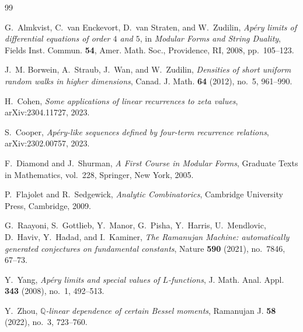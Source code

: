 \documentclass[11pt]{amsart}
\theoremstyle{definition}
\theoremstyle{remark}
\newcommand{\Q}{\mathbb{Q}}
\begin{document}
\begin{thebibliography}{99}

G.~Almkvist, C.~van Enckevort, D.~van Straten, and W.~Zudilin,
\emph{Apéry limits of differential equations of order $4$ and $5$},
in \emph{Modular Forms and String Duality}, Fields Inst. Commun. \textbf{54},
Amer. Math. Soc., Providence, RI, 2008, pp.~105--123.

J.~M. Borwein, A.~Straub, J.~Wan, and W.~Zudilin,
\emph{Densities of short uniform random walks in higher dimensions},
Canad. J. Math. \textbf{64} (2012), no.~5, 961--990.

H.~Cohen,
\emph{Some applications of linear recurrences to zeta values},
arXiv:2304.11727, 2023.

S.~Cooper,
\emph{Apéry-like sequences defined by four-term recurrence relations},
arXiv:2302.00757, 2023.

F.~Diamond and J.~Shurman,
\emph{A First Course in Modular Forms},
Graduate Texts in Mathematics, vol.~228, Springer, New York, 2005.

P.~Flajolet and R.~Sedgewick,
\emph{Analytic Combinatorics},
Cambridge University Press, Cambridge, 2009.

G.~Raayoni, S.~Gottlieb, Y.~Manor, G.~Pisha, Y.~Harris, U.~Mendlovic,
D.~Haviv, Y.~Hadad, and I.~Kaminer,
\emph{The Ramanujan Machine: automatically generated conjectures on fundamental constants},
Nature \textbf{590} (2021), no.~7846, 67--73.

Y.~Yang,
\emph{Apéry limits and special values of $L$-functions},
J. Math. Anal. Appl. \textbf{343} (2008), no.~1, 492--513.

Y.~Zhou,
\emph{$\Q$-linear dependence of certain Bessel moments},
Ramanujan J. \textbf{58} (2022), no.~3, 723--760.

\end{thebibliography}
\end{document}
